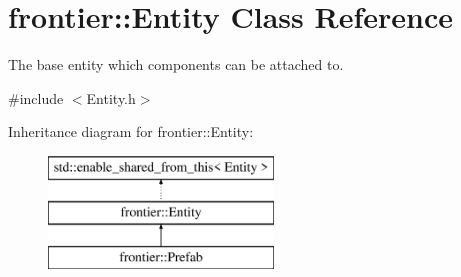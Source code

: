 \hypertarget{classfrontier_1_1_entity}{}\section{frontier\+:\+:Entity Class Reference}
\label{classfrontier_1_1_entity}


The base entity which components can be attached to.  




{\ttfamily \#include $<$Entity.\+h$>$}

Inheritance diagram for frontier\+:\+:Entity\+:\begin{figure}[H]
\begin{center}
\leavevmode
\includegraphics[height=3.000000cm]{classfrontier_1_1_entity}
\end{center}
\end{figure}
